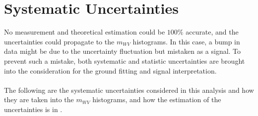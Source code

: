 \section{Systematic Uncertainties}
No measurement and theoretical estimation could be $100\%$ accurate, and the uncertainties could propagate to the $m_{WV}$ histograms. In this case, a bump in data might be due to the uncertainty fluctuation but mistaken as a signal. To prevent such a mistake, both systematic and statistic uncertainties are brought into the consideration for the ground fitting and signal interpretation.
\\
\\The following are the systematic uncertainties considered in this analysis and how they are taken into the $m_{WV}$ histograms, and how the estimation of the uncertainties is in \cite{PERF-2016-01,ATL-PHYS-PUB-2015-037,ATLAS:2019pzw,PERF-2016-04,ATLAS-CONF-2014-018,Herde:2059849}.
